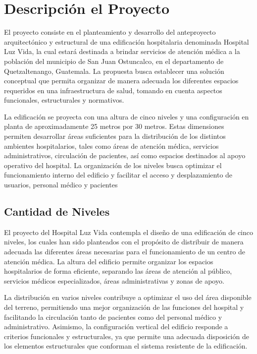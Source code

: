 \documentclass[14pt,letterpaper]{extarticle}
\begin{document}
	\section{Descripción el Proyecto}
	El proyecto consiste en el planteamiento y desarrollo del anteproyecto arquitectónico y estructural de una edificación hospitalaria denominada Hospital Luz Vida, la cual estará destinada a brindar servicios de atención médica a la población del municipio de San Juan Ostuncalco, en el departamento de Quetzaltenango, Guatemala. La propuesta busca establecer una solución conceptual que permita organizar de manera adecuada los diferentes espacios requeridos en una infraestructura de salud, tomando en cuenta aspectos funcionales, estructurales y normativos.

	
	La edificación se proyecta con una altura de cinco niveles y una configuración en planta de aproximadamente 25 metros por 30 metros. Estas dimensiones permiten desarrollar áreas suficientes para la distribución de los distintos ambientes hospitalarios, tales como áreas de atención médica, servicios administrativos, circulación de pacientes, así como espacios destinados al apoyo operativo del hospital. La organización de los niveles busca optimizar el funcionamiento interno del edificio y facilitar el acceso y desplazamiento de usuarios, personal médico y pacientes
	\newpage
	
	\subsection{Cantidad de Niveles}
	El proyecto del Hospital Luz Vida contempla el diseño de una edificación de cinco niveles, los cuales han sido planteados con el propósito de distribuir de manera adecuada las diferentes áreas necesarias para el funcionamiento de un centro de atención médica. La altura del edificio permite organizar los espacios hospitalarios de forma eficiente, separando las áreas de atención al público, servicios médicos especializados, áreas administrativas y zonas de apoyo.
	
	La distribución en varios niveles contribuye a optimizar el uso del área disponible del terreno, permitiendo una mejor organización de las funciones del hospital y facilitando la circulación tanto de pacientes como del personal médico y administrativo. Asimismo, la configuración vertical del edificio responde a criterios funcionales y estructurales, ya que permite una adecuada disposición de los elementos estructurales que conforman el sistema resistente de la edificación.
	\newpage
	
\end{document}
